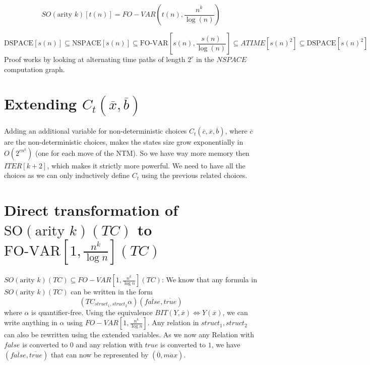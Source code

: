\[SO(\text{arity } k)[t(n)] = FO-VAR\left( t(n), \frac{n^{k}}{\log(n)} \right)\]

\[\text{DSPACE}[s(n)] \subseteq \text{NSPACE}[s(n)] \subseteq \text{FO-VAR}\left[ s(n), \frac{s(n)}{\log(n)} \right] \subseteq ATIME[s(n)^{2}]\subseteq \text{DSPACE}[s(n)^{2}]\]
Proof works by looking at alternating time paths of length \(2^{r}\) in
the \(NSPACE\) computation graph.



\section{\texorpdfstring{Extending
\(C_{t}(\overline{x}, \overline{b})\)}{Extending C\_\{t\}(\textbackslash overline\{x\}, \textbackslash overline\{b\})}}\label{extending-c_toverlinex-overlineb}

Adding an additional variable for non-deterministic choices
\(C_{t}(\overline{c}, \overline{x}, \overline{b})\), where
\(\overline{c}\) are the non-deterministic choices, makes the states
size grow exponentially in \(O(2^{cn^{k}})\) (one for each move of the
NTM). So we have way more memory then \(ITER[k + 2]\), which makes it
strictly more powerful. We need to have all the choices as we can only
inductively define \(C_{t}\) using the previous related choices.

\section{\texorpdfstring{Direct transformation of
\(\text{SO}(\text{arity }k)(TC)\) to
\(\text{FO-VAR}\left[ 1, \frac{n^{k}}{\log n} \right](TC)\)}{Direct transformation of SO(\textbackslash text\{arity \}k)(TC) to FO-VAR\textbackslash left{[} 1, \textbackslash frac\{n\^{}\{k\}\}\{\textbackslash log n\} \textbackslash right{]}(TC)}}\label{direct-transformation-of-sotextarity-ktc-to-fo-varleft-1-fracnklog-n-righttc}

\(SO(\text{arity }k)(TC) \subseteq FO-VAR\left[ 1, \frac{n^{k}}{\log n} \right](TC)\):
We know that any formula in \(SO(\text{arity }k)(TC)\) can be written in
the form \[
(TC_{struct_{1}, struct_{2}}\alpha)(\overline{false}, \overline{true})
\] where \(\alpha\) is quantifier-free. Using the equivalence
\(BIT(Y, \overline{x}) \Leftrightarrow Y(\overline{x})\), we can write
anything in \(\alpha\) using
\(FO-VAR\left[ 1, \frac{n^{k}}{\log n} \right]\). Any relation in
\(struct_{1}, struct_{2}\) can also be rewritten using the extended
variables. As we now any Relation with \(false\) is converted to \(0\)
and any relation with \(true\) is converted to \(1\), we have
\((\overline{false}, \overline{true})\) that can now be represented by
\((\overline{0}, \overline{max})\).

